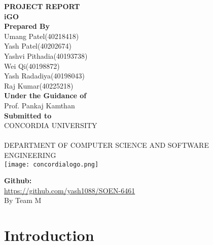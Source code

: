 \documentclass[a4paper,12pt]{report}
\begin{document}
\begin{titlepage}
   \begin{center}
       \vspace*{-8ex}
        \begin{figure}[h!]
  \centering
\end{figure}

       \textbf{\large PROJECT REPORT }\\[0.3in]
        \textbf{\large iGO} \\ [0.3in]
        \textbf{\large Prepared By} \\[0.5in]
        \normal Umang Patel(40218418)\\[0.1in]
        \normal Yash Patel(40202674)\\[0.1in]
        \normal Yashvi Pithadia(40193738)\\[0.1in]
        \normal Wei Qi(40198872)\\[0.1in]
        \normal Yash Radadiya(40198043)\\[0.1in]
        \normal Raj Kumar(40225218)\\[0.5in]

        \textbf{\large Under the Guidance of}\\[0.15in]
        \normal Prof. Pankaj Kamthan\\[0.4in]

        \textbf{\large Submitted to}\\[0.15in]
        \normal CONCORDIA UNIVERSITY\\\\[0.05in]
        \normal DEPARTMENT OF COMPUTER SCIENCE AND SOFTWARE ENGINEERING\\[0.2in]
        \texttt{[image: concordialogo.png]}

       \vspace{1.0cm}
      
        \textbf{Github:}\\\url{https://github.com/yash1088/SOEN-6461}\\[0.2in]
         \normal By
        \normal Team M
       \vfill
   \end{center}
\end{titlepage}

\tableofcontents
\chapter{Introduction}
\end{document}
